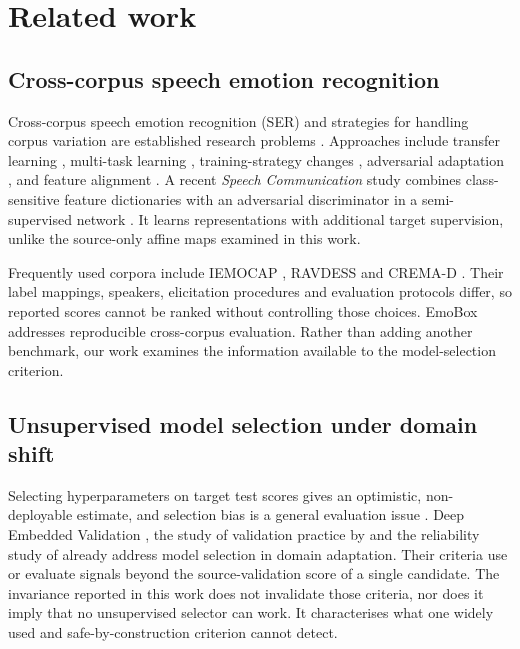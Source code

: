 \section{Related work}
\label{sec:related}

\subsection{Cross-corpus speech emotion recognition}
\label{sec:related-crosscorpus}

Cross-corpus speech emotion recognition (SER) and strategies for handling
corpus variation are established research problems \cite{schuller2010cross}. Approaches include transfer
learning \cite{naderi2023cross}, multi-task learning \cite{fu2023cross},
training-strategy changes \cite{pastor2023cross}, adversarial adaptation
\cite{latif2023self}, and feature alignment \cite{naeeni2025feature}.
A recent \emph{Speech Communication} study combines class-sensitive feature
dictionaries with an adversarial discriminator in a semi-supervised network
\cite{zhang2025sdan}. It learns representations with additional target
supervision, unlike the source-only affine maps examined in this work.

Frequently used corpora include IEMOCAP \cite{busso2008iemocap}, RAVDESS
\cite{livingstone2018ryerson} and CREMA-D \cite{cao2014crema}. Their label
mappings, speakers, elicitation procedures and evaluation protocols differ, so
reported scores cannot be ranked without controlling those choices. EmoBox
\cite{ma2024emobox} addresses reproducible cross-corpus evaluation. Rather than
adding another benchmark, our work examines the information available to the
model-selection criterion.

\subsection{Unsupervised model selection under domain shift}
\label{sec:related-protocol}

Selecting hyperparameters on target test scores gives an optimistic,
non-deployable estimate, and selection bias is a general evaluation issue
\cite{cawley2010selection}. Deep Embedded Validation \cite{you2019selection},
the study of validation practice by \cite{ericsson2023practices} and the
reliability study of \cite{hu2024selection} already address model selection in
domain adaptation. Their criteria use or evaluate signals beyond the
source-validation score of a single candidate. The invariance reported in this
work does not invalidate those criteria, nor does it imply that no unsupervised
selector can work. It characterises what one widely used and
safe-by-construction criterion cannot detect.

